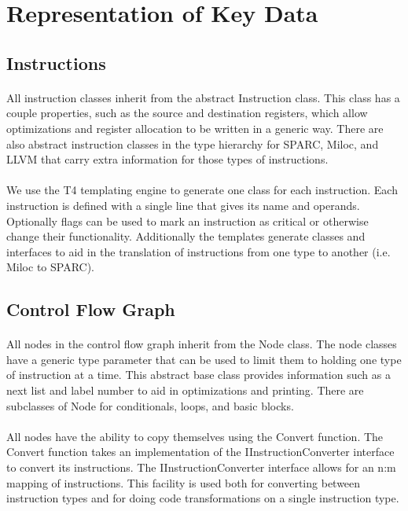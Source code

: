 \documentclass[12pt]{article}
\begin{document}
\pagebreak

\section{Representation of Key Data}


\subsection{Instructions}
\paragraph{}
All instruction classes inherit from the abstract Instruction class.
This class has a couple properties, such as the source and destination registers, which allow optimizations and register allocation to be written in a generic way.
There are also abstract instruction classes in the type hierarchy for SPARC, Miloc, and LLVM that carry extra information for those types of instructions.


\paragraph{}
We use the T4 templating engine to generate one class for each instruction.
Each instruction is defined with a single line that gives its name and operands.
Optionally flags can be used to mark an instruction as critical or otherwise change their functionality.
Additionally the templates generate classes and interfaces to aid in the translation of instructions from one type to another (i.e. Miloc to SPARC).

\subsection{Control Flow Graph}
\paragraph{}
All nodes in the control flow graph inherit from the Node class.
The node classes have a generic type parameter that can be used to limit them to holding one type of instruction at a time.
This abstract base class provides information such as a next list and label number to aid in optimizations and printing.
There are subclasses of Node for conditionals, loops, and basic blocks.


\paragraph{}
All nodes have the ability to copy themselves using the Convert function.
The Convert function takes an implementation of the IInstructionConverter interface to convert its instructions.
The IInstructionConverter interface allows for an n:m mapping of instructions.
This facility is used both for converting between instruction types and for doing code transformations on a single instruction type.
\end{document}
